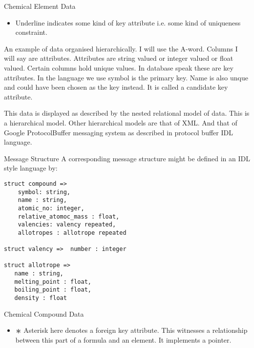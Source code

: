 
\begin{frame}{Chemical Element Data}
\scalebox{0.75}{

}
\begin{itemize}
	\item Underline indicates some kind of key attribute i.e. some kind of uniqueness constraint.
\end{itemize}
An example of data organised hierarchically. 
I will use the A-word. Columns I will say are attributes. Attributes are string valued or integer valued or float  valued.
Certain columns hold unique values. In database speak these are key attributes. In the language we use
symbol is the primary key. Name is also unque and could have been chosen as the key instead. It is called a candidate key attribute.


This data is displayed as described by the nested relational model of data. This is a hierarchical model.
Other hierarchical models are that of XML. And that of Google ProtocolBuffer messaging system as described in protocol buffer IDL language.

\end{frame}


\begin{frame}[fragile]{Message Structure}
A corresponding message structure might be defined 
in an IDL style language by:

\begin{lstlisting}[basicstyle=\footnotesize,language=IDL]
struct compound => 
    symbol: string,
    name : string,
    atomic_no: integer,
    relative_atomoc_mass : float,
    valencies: valency repeated,
    allotropes : allotrope repeated

struct valency =>  number : integer 

struct allotrope =>
   name : string,
   melting_point : float,
   boiling_point : float,
   density : float
\end{lstlisting}
\end{frame}


\begin{frame}{Chemical Compound Data}
\scalebox{0.75}{

}
\begin{itemize}
\item $\largeAsterisk$ Asterisk here denotes a foreign key attribute. 
\pause This witnesses a relationship between this part of a formula and an element. \pause It implements a pointer.
\end{itemize}
\end{frame}

